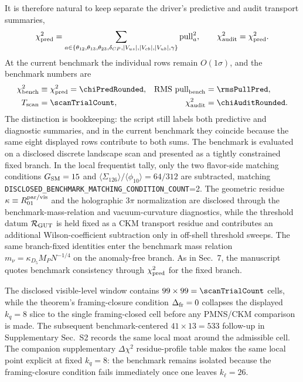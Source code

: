 \documentclass[11pt]{article}
\begin{document}
It is therefore natural to keep separate the driver's predictive and audit transport summaries,
\begin{equation}
 \chi_{\rm pred}^2
 =
 \sum_{a\in\{\theta_{12},\theta_{13},\theta_{23},\delta_{CP},|V_{us}|,|V_{cb}|,|V_{ub}|,\gamma\}}
 \mathrm{pull}_a^2,
 \qquad
 \chi_{\rm audit}^2
 =
 \chi_{\rm pred}^2.
\end{equation}
At the current benchmark the individual rows remain $O(1\sigma)$, and the benchmark numbers are
\begin{equation}
 \begin{aligned}
  \chi_{\rm bench}^2&\equiv\chi_{\rm pred}^2=\chiPredRounded,
  & \mathrm{RMS\ pull}_{\rm bench}&=\rmsPullPred, \\
  T_{\rm scan}&=\scanTrialCount,
  & \chi_{\rm audit}^2&=\chiAuditRounded.
 \end{aligned}
\end{equation}
The distinction is bookkeeping: the script still labels both predictive and diagnostic summaries, and in the current benchmark they coincide because the same eight displayed rows contribute to both sums. The benchmark is evaluated on a disclosed discrete landscape scan and presented as a tightly constrained fixed branch. In the local frequentist tally, only the two flavor-side matching conditions $G_{\rm SM}=15$ and $\langle \Sigma_{126} \rangle / \langle \phi_{10} \rangle=64/312$ are subtracted, matching \texttt{DISCLOSED\_BENCHMARK\_MATCHING\_CONDITION\_COUNT}=2. The geometric residue $\kappa\equiv R_{01}^{\rm par/vis}$ and the holographic $3\pi$ normalization are disclosed through the benchmark-mass-relation and vacuum-curvature diagnostics, while the threshold datum $\mathcal R_{\rm GUT}$ is held fixed as a CKM transport residue and contributes an additional Wilson-coefficient subtraction only in off-shell threshold sweeps. The same branch-fixed identities enter the benchmark mass relation $m_\nu=\kappa_{D_5}M_PN^{-1/4}$ on the anomaly-free branch. As in Sec.~7, the manuscript quotes benchmark consistency through $\chi_{\rm pred}^2$ for the fixed branch.

The disclosed visible-level window contains $99\times99=\scanTrialCount$ cells, while the theorem's framing-closure condition $\Delta_{\rm fr}=0$ collapses the displayed $k_q=8$ slice to the single framing-closed cell before any PMNS/CKM comparison is made. The subsequent benchmark-centered $41\times13=533$ follow-up in Supplementary Sec.~S2 records the same local moat around the admissible cell. The companion supplementary $\Delta\chi^2$ residue-profile table makes the same local point explicit at fixed $k_q=8$: the benchmark remains isolated because the framing-closure condition fails immediately once one leaves $k_{\ell}=26$.
\end{document}
